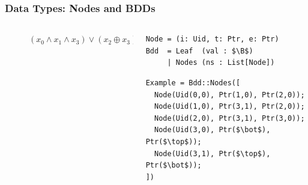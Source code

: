 \documentclass[english, aspectratio=169]{beamer}
\newcommand{\B}[0]{\ensuremath{\mathbb{B}}}
\begin{document}
\begin{frame}[t, fragile]
  \frametitle{Data Types: Nodes and BDDs}

  \begin{columns}
    \begin{column}[t]{0.4\linewidth}
      \begin{figure}
        \centering

        \begin{tikzpicture}[every node/.style={transform shape}]
          
        \end{tikzpicture}

        \caption{$(x_0 \wedge x_1 \wedge x_3) \vee (x_2 \oplus x_3)$}
      \end{figure}
    \end{column}
    \begin{column}[t]{0.6\linewidth}
      \begin{lstlisting}
Node = (i: Uid, t: Ptr, e: Ptr)
Bdd  = Leaf  (val : $\B$)
     | Nodes (ns : List[Node])
      \end{lstlisting}

      \begin{lstlisting}[firstnumber=4]
Example = Bdd::Nodes([
  Node(Uid(0,0), Ptr(1,0), Ptr(2,0));
  Node(Uid(1,0), Ptr(3,1), Ptr(2,0));
  Node(Uid(2,0), Ptr(3,1), Ptr(3,0));
  Node(Uid(3,0), Ptr($\bot$),    Ptr($\top$));
  Node(Uid(3,1), Ptr($\top$),    Ptr($\bot$));
])
      \end{lstlisting}
    \end{column}
  \end{columns}
\end{frame}
\end{document}
